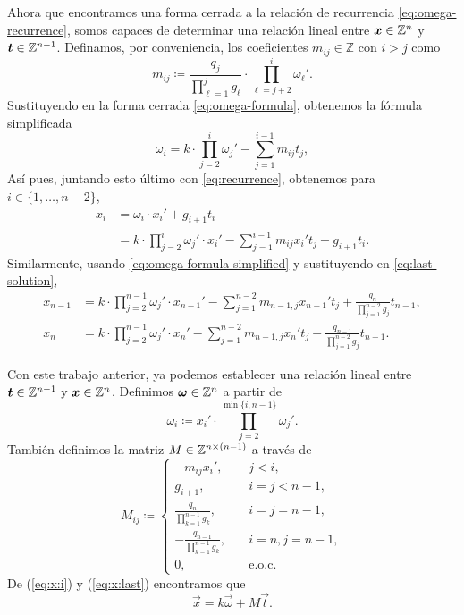 Ahora que encontramos una forma cerrada a la relación de recurrencia \eqref{eq:omega-recurrence},
somos capaces de determinar una relación lineal entre $\boldsymbol{x} \in \mathbb{Z}^n$ y $\boldsymbol{t} \in \mathbb{Z}^{n-1}$.
Definamos, por conveniencia, los coeficientes $m_{ij} \in \mathbb{Z}$ con $i > j$ como
\begin{equation}
	\label{phase-2:eq:coeffs}
	m_{ij} \coloneq \frac{q_j}{\prod_{\ell = 1}^{j}g_\ell} \cdot \prod_{\ell = j +
	2}^{i}\omega_\ell'.
\end{equation}
Sustituyendo en la forma cerrada \eqref{eq:omega-formula}, obtenemos la fórmula simplificada
\begin{equation}
	\label{eq:omega-formula-simplified}
	\omega_i =
	k \cdot \prod_{j=2}^{i} \omega_j'
	- \sum_{j=1}^{i - 1}m_{ij}t_j,
\end{equation}
Así pues, juntando esto último con \eqref{eq:recurrence}, obtenemos para $i \in \{1, \ldots, n -
2\}$, 
\begin{align}
	x_i &= \omega_i \cdot x_i' + g_{i + 1}t_i \nonumber \\
		&= k \cdot \prod_{j=2}^{i}\omega_j' \cdot x_i' - \sum_{j=1}^{i - 1}m_{ij}x_i'
		t_j + g_{i + 1}t_i \label{eq:x:i}.
\end{align}
Similarmente, usando \eqref{eq:omega-formula-simplified} y sustituyendo en \eqref{eq:last-solution},
\begin{subequations}
	\label{eq:x:last}
	\begin{align}
		x_{n-1} &= k \cdot \prod_{j=2}^{n-1} \omega_j' \cdot x_{n-1}' - \sum_{j=1}^{n-2}
		m_{n-1,j}x_{n-1}' t_j + \frac{q_n}{\prod_{j=1}^{n-2}g_j} t_{n-1}, \\
		x_{n} &= k \cdot \prod_{j=2}^{n-1} \omega_j' \cdot x_{n}' - \sum_{j=1}^{n-2}
		m_{n-1,j}x_{n}' t_j - \frac{q_{n - 1}}{\prod_{j=1}^{n-2}g_j} t_{n-1}.
	\end{align}
\end{subequations}

Con este trabajo anterior, ya podemos establecer una relación lineal entre $\boldsymbol{t} \in \mathbb{Z}^{n-1}$ y
$\boldsymbol{x} \in \mathbb{Z}^n$. Definimos $\boldsymbol{\omega} \in \mathbb{Z}^n$ a partir de
\begin{equation}
	\label{eq:vec-omega}
	\omega_i \coloneq x_i' \cdot \prod_{j = 2}^{\min{\lbrace i, n - 1 \rbrace}}\omega_j'.
\end{equation}
También definimos la matriz $M \in \mathbb{Z}^{n \times (n - 1)}$ a través de
\begin{equation}
	\label{eq:mat-T}
	M_{ij} \coloneq \begin{cases}
		-m_{ij}x_i', &\quad j < i, \\
		g_{i + 1},  &\quad i = j < n - 1, \\
		\frac{q_n}{\prod_{k=1}^{n-1}g_k}, &\quad i = j = n - 1, \\
		-\frac{q_{n-1}}{\prod_{k=1}^{n-1}g_k}, &\quad i = n, j = n - 1, \\
		0, &\quad \text{e.o.c.}
	\end{cases}
\end{equation}
De (\ref{eq:x:i}) y (\ref{eq:x:last}) encontramos que
\begin{equation}
	\label{eq:transf}
	\vec{x} = k\vec{\omega} + M\vec{t}.
\end{equation}

